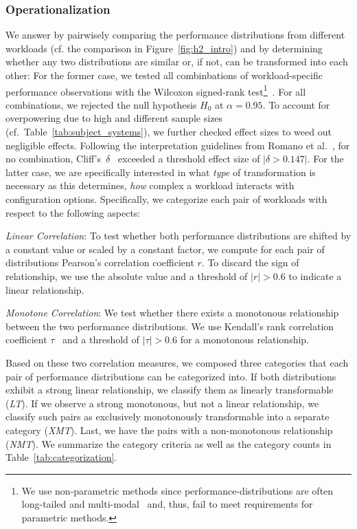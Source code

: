 {\subsubsection{Operationalization}
We answer  by pairwisely comparing the performance distributions from different workloads (cf. the comparison in Figure~\ref{fig:h2_intro}) and by determining whether any two distributions are similar or, if not, can be transformed into each other: For the former case, we tested all combinbations of workload-specific performance observations with the Wilcoxon signed-rank test\footnote{We use non-parametric methods since performance-distributions are often long-tailed and multi-modal~\cite{curtsinger_stabilizer_2013,maricq2018taming} and, thus, fail to meet requirements for parametric methods.}~\cite{lovric_international_2010}. For all combinations, we rejected the null hypothesis $H_0$ at $\alpha=0.95$. To account for overpowering due to high and different sample sizes (cf.~Table~\ref{tab:subject_systems}), we further checked effect sizes to weed out negligible effects. Following the interpretation guidelines from Romano et al.~\cite{romano2006exploring}, for no combination, Cliff's~$\delta$~\cite{Cliff1993DominanceSO} exceeded a threshold effect size of $\vert\delta > 0.147\vert$.
For the latter case, we are specifically interested in what \textit{type} of transformation is necessary as this determines, \textit{how} complex a workload interacts with configuration options. Specifically, we categorize each pair of workloads with respect to the following aspects: 

\begin{compactenum}

	\item \textit{Linear Correlation}: To test whether both performance distributions are shifted by a constant value or scaled by a constant factor, we compute for each pair of distributions Pearson's correlation coefficient $r$. To discard the sign of relationship, we use the absolute value and a threshold of $\vert r\vert >0.6$ to indicate a linear relationship.
	
	\item \textit{Monotone Correlation}: We test whether there exists a monotonous relationship between the two performance distributions. We use Kendall's rank correlation coefficient $\tau$~\cite{kendall1938new} and a threshold of  $\vert\tau\vert > 0.6$ for a monotonous relationship.
\end{compactenum}
{\color{black}Based on these two correlation measures, we composed three categories that each pair of performance distributions can be categorized into.
If both distributions exhibit a strong linear relationship, we classify them as linearly transformable (\textit{\colorbox{lt-color}{LT}}). If we observe a strong monotonous, but not a linear relationship, we classify such pairs as exclusively monotonously transformable into a separate category (\textit{\colorbox{xmt-color}{XMT}}). Last, we have the pairs with a non-monotonous relationship  (\textit{\colorbox{nmt-color}{NMT}}). 
We summarize the category criteria as well as the category counts in Table~\ref{tab:categorization}. 

}}
